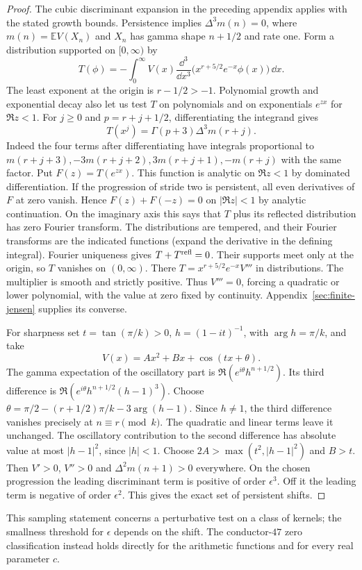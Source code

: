 \begin{proof}
The cubic discriminant expansion in the preceding appendix applies with the stated growth bounds. Persistence implies $\Delta^3m(n)=0$, where $m(n)=\mathbb EV(X_n)$ and $X_n$ has gamma shape $n+1/2$ and rate one.
Form a distribution supported on $[0,\infty)$ by
\[
 T(\phi)=-\int_0^\infty V(x)\frac{\dd^3}{\dd x^3}
       \bigl(x^{r+5/2}e^{-x}\phi(x)\bigr)\,\dd x .
\]
The least exponent at the origin is $r-1/2>-1$. Polynomial growth and exponential decay also let us test $T$ on polynomials and on exponentials $e^{zx}$ for $\Re z<1$. For $j\ge0$ and $p=r+j+1/2$, differentiating the integrand gives
\[
 T(x^j)=\Gamma(p+3)\Delta^3m(r+j).
\]
Indeed the four terms after differentiating have integrals proportional to $m(r+j+3),-3m(r+j+2),3m(r+j+1),-m(r+j)$ with the same factor. Put $F(z)=T(e^{zx})$. This function is analytic on $\Re z<1$ by dominated differentiation. If the progression of stride two is persistent, all even derivatives of $F$ at zero vanish. Hence $F(z)+F(-z)=0$ on $|\Re z|<1$ by analytic continuation. On the imaginary axis this says that $T$ plus its reflected distribution has zero Fourier transform. The distributions are tempered, and their Fourier transforms are the indicated functions (expand the derivative in the defining integral). Fourier uniqueness gives $T+T^{\rm refl}=0$. Their supports meet only at the origin, so $T$ vanishes on $(0,\infty)$. There $T=x^{r+5/2}e^{-x}V'''$ in distributions. The multiplier is smooth and strictly positive. Thus $V'''=0$, forcing a quadratic or lower polynomial, with the value at zero fixed by continuity. Appendix~\ref{sec:finite-jensen} supplies its converse.

For sharpness set $t=\tan(\pi/k)>0$, $h=(1-it)^{-1}$, with $\arg h=\pi/k$, and take
\[
 V(x)=Ax^2+Bx+\cos(tx+\theta).
\]
The gamma expectation of the oscillatory part is $\Re(e^{i\theta}h^{n+1/2})$. Its third difference is $\Re(e^{i\theta}h^{n+1/2}(h-1)^3)$. Choose
$\theta=\pi/2-(r+1/2)\pi/k-3\arg(h-1)$.
Since $h\ne1$, the third difference vanishes precisely at $n\equiv r\pmod k$. The quadratic and linear terms leave it unchanged. The oscillatory contribution to the second difference has absolute value at most $|h-1|^2$, since $|h|<1$. Choose $2A>\max(t^2,|h-1|^2)$ and $B>t$. Then $V'>0$, $V''>0$ and $\Delta^2m(n+1)>0$ everywhere. On the chosen progression the leading discriminant term is positive of order $\epsilon^3$. Off it the leading term is negative of order $\epsilon^2$. This gives the exact set of persistent shifts.
\end{proof}
This sampling statement concerns a perturbative test on a class of kernels; the smallness threshold for $\epsilon$ depends on the shift. The conductor-$47$ zero classification instead holds directly for the arithmetic functions and for every real parameter $c$.
